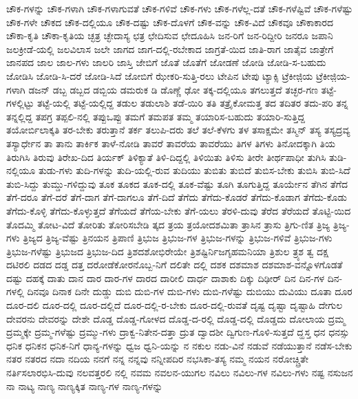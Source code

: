 {ಚೌಕ-ಗಳನ್ನು
ಚೌಕ-ಗಳಾಗಿ
ಚೌಕ-ಗಳಾಗುವತೆ
ಚೌಕ-ಗಳಿವೆ
ಚೌಕ-ಗಳು
ಚೌಕ-ಗಳೆಲ್ಲ-ದತೆ
ಚೌಕ-ಗಳೆಷ್ಟಿವೆ
ಚೌಕ-ಗಳೆಷ್ಟು
ಚೌಕ-ಗಳೇ
ಚೌಕದ
ಚೌಕ-ದಲ್ಲಿಯೂ
ಚೌಕ-ದಷ್ಟು
ಚೌಕ-ದೊಳಗೆ
ಚೌಕ-ವನ್ನು
ಚೌಕ-ವಿದೆ
ಚೌಕವೂ
ಚೌಕಾಕಾರದ
ಚೌಕಾ-ಕೃತಿ
ಚೌಕಾ-ಕೃತಿಯ
ಚ್ಛತ್ರ
ಚ್ಛೇದಾಸ್ಯ
ಛತ್ರ
ಛೇದಿಸುವ
ಛೇದೂಹಿಸಿ
ಜನ-ರಿಗೆ
ಜನ-ರಿದ್ದೀರಿ
ಜನರೂ
ಜಪಾನಿ
ಜಲಕ್ರೀಡೆ-ಯಲ್ಲಿ
ಜಲವಿಲಾಸ
ಜಲೇ
ಜಾಗದ
ಜಾಗ-ದಲ್ಲಿ-ರಬೇಕಾದ
ಜಾಗ್ರತೆ-ಯಿದ
ಜಾತಿ-ರಾಗ
ಜಾತೈವ
ಜಾತ್ರೇಗೆ
ಜಾನಪದ
ಜಾಲ
ಜಾಲ-ಗಳು
ಜಾಲರಿ
ಜಾಸ್ತಿ
ಜೇಬಿಗೆ
ಜೊತೆ
ಜೊತೆಗೆ
ಜೋಡಣೆ
ಜೋಡಿ
ಜೋಡಿ-ಸ-ಬಹುದು
ಜೋಡಿಸಿ
ಜೋಡಿ-ಸಿ-ದರೆ
ಜೋಡಿ-ಸಿದೆ
ಜೋಬಿಗೆ
ಝೇಕರಿ-ಸುತ್ತಿ-ರಲು
ಟೇಪಿನ
ಟೇಪು
ಟ್ಯಾಕ್ಸಿ
ಟ್ರೆಕೀಜಿ಼ಯ
ಟ್ರೆಕೀಜಿ಼ಯ-ಗಳಾಗಿ
ಡಜನ್
ಡಬ್ಬ
ಡಬ್ಬದ
ಡಬ್ಬಿಯ
ಡಮರುಕ
ಡಿ
ಡೊಣ್ಣೆ
ಢೋ
ತಕ್ಕ-ದಲ್ಲಿಯೂ
ತಗಲುತ್ತದೆ
ತಚ್ಛರ-ಗಣ
ತಟ್ಟೆ-ಗಳಲ್ಲಿಟ್ಟು
ತಟ್ಟೆ-ಯಲ್ಲಿ
ತಟ್ಟೆ-ಯಲ್ಲಿದ್ದ
ತಡುಲ
ತಡುಲಾಶಿ
ತಡೆ-ಯಿರಿ
ತತಿ
ತತ್ರೈಕೋಮತ್ತ
ತದ
ತದಿತರ
ತದು-ಪರಿ
ತನ್ನ
ತನ್ನಲ್ಲಿದ್ದ
ತಪಗ್ರ
ತಪ್ಪಲಿ-ನಲ್ಲಿ
ತಪ್ಪುಒಪ್ಪು
ತಮಗೆ
ತಮಪತ
ತಮ್ಮ
ತಯಾರಿಸ-ಬಹುದು
ತಯಾರಿ-ಸುತ್ತಿದ್ದ
ತಯೋರ್ಬಿಲಾಕ್ಕತಿ
ತರ-ಬೇಕು
ತರುತ್ತಾನೆ
ತರ್ಕ
ತಲುಪಿ-ದರು
ತಲೆ
ತಲೆ-ಕೆಳಗು
ತಳ
ತಸಾಕ್ಷಮೇ
ತಸ್ಮಿನ್
ತಸ್ಯ
ತಸ್ಯದ್ರವ್ಯ
ತಸ್ಯಾರ್ಧೇನ
ತಾ
ತಾನು
ತಾರ್ಕಿಕ
ತಾಳೆ-ನೋಡಿ
ತಾವರೆ
ತಾವರೆಯ
ತಾವರೆಯು
ತಿಗಳ
ತಿಗಳು
ತಿನೋದಕ್ಕಾಗಿ
ತಿಯ
ತಿರುಗಿಸಿ
ತಿರುವು
ತಿರೇಖ-ದಿದ
ತಿರ್ಯಕ್
ತಿಳಿಕ್ಯಾತೆ
ತಿಳಿ-ದಿದ್ದಲ್ಲಿ
ತಿಳಿಯಿತು
ತಿಳಿಸು
ತೀರೇ
ತೀರ್ಥಪಾಧೀ
ತುಗಿಸಿ
ತುಡಿ-ನಲ್ಲಿಯೂ
ತುಡು-ಗಳು
ತುದಿ-ಗಳನ್ನು
ತುದಿ-ಯಲ್ಲಿ-ರುವ
ತುದಿಯು
ತುಬಿತು
ತುಬಿದೆ
ತುಬಿಸ-ಬೇಕು
ತುಬಿಸಿ
ತುಬಿ-ಸಿದೆ
ತುಬಿ-ಸಿದ್ದು
ತುಮ್ಡು-ಗಳಿದ್ದುವು
ತೂಕ
ತೂಕದ
ತೂಕ-ದಲ್ಲಿ
ತೂಕ-ವೆಷ್ಟು
ತೂಗಿ
ತೂಗುತ್ತಿದ್ದ
ತೂರ್ಯೇನ
ತೆಗಿನ
ತೆಗೆದ
ತೆಗೆ-ದರೂ
ತೆಗೆ-ದರೆ
ತೆಗೆ-ದಾಗ
ತೆಗೆ-ದಾಗಲೂ
ತೆಗೆ-ದಿದೆ
ತೆಗೆದು
ತೆಗೆದು-ಕೊಡರೆ
ತೆಗೆದು-ಕೊಡಾಗ
ತೆಗೆದು-ಕೊಡು
ತೆಗೆದು-ಕೊಳ್ಳಿ
ತೆಗೆದು-ಕೊಳ್ಳುತ್ತದೆ
ತೆಗೆಯದೆ
ತೆಗೆಯ-ಬೇಕು
ತೆಗೆ-ಯಲು
ತೆರಳಿ-ದುವು
ತೆರೆದ
ತೆರೆಯದೆ
ತೊಟ್ಟಿ-ಯಿದ
ತೊದಮ್ಮಿ
ತೋಟ-ವಿದೆ
ತೋರಿತು
ತೋರಿಸಬೇಡಿ
ತ್ಕದ
ತ್ರಯ
ತ್ರಯೋದಶಮಿತಾ
ತ್ರಾಸಿನ
ತ್ರಾಸು
ತ್ರಿಗು-ಣಿತ
ತ್ರಿಜ್ಯ
ತ್ರಿಜ್ಯ-ಗಳು
ತ್ರಿಜ್ಯದ
ತ್ರಿಜ್ಯ-ವೆಷ್ಟು
ತ್ರಿನಯನ
ತ್ರಿಪಾಣಿ
ತ್ರಿಭುಜ
ತ್ರಿಭುಜ-ಗಳ
ತ್ರಿಭುಜ-ಗಳನ್ನು
ತ್ರಿಭುಜ-ಗಳಿವೆ
ತ್ರಿಭುಜ-ಗಳು
ತ್ರಿಭುಜ-ಗಳೆಷ್ಟು
ತ್ರಿಭುಜದ
ತ್ರಿಭುಜ-ದಿದ
ತ್ರಿಶದಶೋಭಿರೇಯೇ
ತ್ರಿಶಷ್ಟಿರ್ನಿಜಗೃಹಮನಿಯಾ
ತ್ರಿಶುಲ
ತ್ರ್ಯಶ
ತ್ವ
ದಕ್ಷ
ದಟಿರಲಿ
ದಡದ
ದಡ್ಡ
ದತ್ತ
ದರೋಡೆಕೋರನೊಬ್ಬ-ನಿಗೆ
ದಲಿತೇ
ದಲ್ಲಿ
ದಶಕ
ದಶಮಾಶ
ದಶಮಾಶ-ವನ್ನೊಳಗೊಡತೆ
ದಷ್ಟು
ದಹಕ್ಕೆ
ದಾತು
ದಾನ
ದಾರ
ದಾರ-ಗಳ
ದಾರದ
ದಾರೀಲಿ
ದಾರ್ಧ
ದಾಶಾಕು
ದಿಕ್ಕು
ದಿಢೀರ್
ದಿನ
ದಿನ-ಗಳ
ದಿನ-ಗಳಲ್ಲಿ
ದಿನವೂ
ದಿನಾಕ
ದಿನೇ
ದುಡ್ಡು
ದುಬಿ
ದುಬಿ-ಗಳ
ದುಬಿ-ಗಳು
ದುಬಿ-ಗಳೆಷ್ಟು
ದುಬಿಯು
ದುವಿಯು
ದೂತಾ
ದೂರ
ದೂರ-ದಲಿ
ದೂರ-ದಲ್ಲಿ
ದೂರ-ದಲ್ಲಿದೆ
ದೂರ-ದಲ್ಲಿ-ರ-ಬೇಕು
ದೂರ-ದಲ್ಲಿ-ರುವತೆ
ದೃಷ್ಟ
ದೃಷ್ಟಾ
ದೃಷ್ಟಾಹಿ
ದೇಗುಲ
ದೇವರನು
ದೇವರನ್ನು
ದೇಶೇ
ದೊಡ್ಡ
ದೊಡ್ಡ-ಗೋಳದ
ದೊಡ್ಡ-ದ-ರಲ್ಲಿ
ದೊಡ್ಡ-ದಲ್ಲಿ
ದೊಡ್ಡದು
ದೋಲಾಯ
ದ್ರಮ್ಮ
ದ್ರಮ್ಮಕ್ಕೇ
ದ್ರಮ್ಮ-ಗಳೆಷ್ಟು
ದ್ರಮ್ಮು-ಗಳು
ದ್ರಾಕ್ವ-ನಿತೇನ-ದತ್ತಾ
ದ್ರುತ
ದ್ವಾದಶೀ
ದ್ವಿಗುಣ-ಗೊಳಿ-ಸುತ್ತದೆ
ದ್ಹಸ್ತ
ಧನ
ಧನಸ್ಸು
ಧನಿಕ
ಧನಿಕನ
ಧನಿಕ-ನಿಗೆ
ಧಾನ್ಯ-ಗಳನ್ನು
ಧ್ವಜ
ಧ್ವನಿ-ಯನ್ನು
ನ
ನಕುಲ
ನಡು-ವಿನೆ
ನಡುವೆ
ನಡೆಯುತ್ತಾನೆ
ನಡೆಸ-ಬೇಕು
ನತರ
ನತರದ
ನದಾ
ನದಿಯ
ನನಗೆ
ನನ್ನ
ನನ್ನವು
ನನ್ನೀಪದಿರ
ನಭಸಿಕಾ-ತಸ್ಯ
ನಮ್ಮ
ನಯನ
ನರೋಚ್ಚ್ರಿತೇ
ನರ್ತಿಸಲಾರಭಿಸಿ-ದುವು
ನಲವತ್ತರಲಿ
ನಲ್ಲಿ
ನವಮ
ನವಲನ-ಯುಗಲ
ನವಿಲು
ನವಿಲು-ಗಳ
ನವಿಲು-ಗಳು
ನಷ್ಟ
ನಸುಜನ
ನಾ
ನಾಟ್ಯ
ನಾಣ್ಯ
ನಾಣ್ಯಕ್ಕಿತ
ನಾಣ್ಯ-ಗಳ
ನಾಣ್ಯ-ಗಳನ್ನು
}
